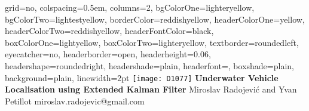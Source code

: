 \documentclass[portrait,final,a0paper]{baposter}
\begin{document}
\newlength{\leftimgwidth}
\begin{poster}%
  {
  grid=no,
  colspacing=0.5em,
  columns=2,
  bgColorOne=lighteryellow,
  bgColorTwo=lightestyellow,
  borderColor=reddishyellow,
  headerColorOne=yellow,
  headerColorTwo=reddishyellow,
  headerFontColor=black,
  boxColorOne=lightyellow,
  boxColorTwo=lighteryellow,
  textborder=roundedleft,
  eyecatcher=no,
  headerborder=open,
  headerheight=0.06\textheight,
  headershape=roundedright,
  headershade=plain,
  headerfont=\Large\textsf, %
  boxshade=plain,
  background=plain,
  linewidth=2pt
  }
  {\texttt{[image: D1077]}} %
  {\sf %
  \bf%
  \vspace{0.5em}	  
  Underwater Vehicle Localisation using Extended Kalman Filter}
  {\sf %
  \vspace{0.05em}
  \large{Miroslav Radojevi\'{c} and Yvan Petillot} \hspace{5em} \normalsize{miroslav.radojevic@gmail.com}
  }
  {%
  }


\end{poster}
\end{document}
